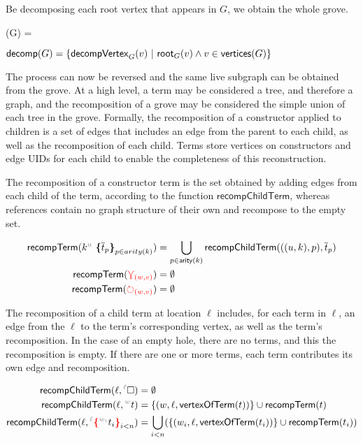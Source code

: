 Be decomposing each root vertex that appears in $G$, we obtain the whole grove. 

\begin{definition}
    (G) = 
\end{definition}

\begin{definition}
    $\mathsf{decomp}(G) = \left\{\mathsf{decompVertex}_{G}(v) ~\vert~\mathsf{root}_G(v) \land v \in \mathsf{vertices}(G)\right\}$
\end{definition}

The process can now be reversed and the same live subgraph can be obtained from the grove. At a high level, a term may be considered a tree, and therefore a graph, and the recomposition of a grove may be considered the simple union of each tree in the grove. Formally, the recomposition of a constructor applied to children is a set of edges that includes an edge from the parent to each child, as well as the recomposition of each child. Terms store vertices on constructors and edge UIDs for each child to enable the completeness of this reconstruction. 

The recomposition of a constructor term is the set obtained by adding edges from each child of the term, according to the function $\mathsf{recompChildTerm}$, whereas references contain no graph structure of their own and recompose to the empty set. 

\begin{definition}
    \begin{align*}
        \mathsf{recompTerm}(\genericTerm{u}{\subtermMV_p}) &= \bigcup_{p\in \mathsf{arity}(k)}\mathsf{recompChildTerm}(((u,k),p), \subtermMV_p)\\
        \mathsf{recompTerm}(\multiref) &= \emptyset\\
        \mathsf{recompTerm}(\uniref) &= \emptyset
    \end{align*}
\end{definition}

The recomposition of a child term at location $\ell$ includes, for each term in $\ell$, an edge from the $\ell$ to the term's corresponding vertex, as well as the term's recomposition. In the case of an empty hole, there are no terms, and this the recomposition is empty. If there are one or more terms, each term contributes its own edge and recomposition. 

\begin{definition}
    \begin{align*}
    \mathsf{recompChildTerm}(\ell, \ehole) &= \emptyset\\
    \mathsf{recompChildTerm}(\ell, \eid{w}{}\termMV) &= \SetOf{(w, \ell, \mathsf{vertexOfTerm}(\termMV))}\cup \mathsf{recompTerm}(t)\\
    \mathsf{recompChildTerm}(\ell, \conflictHoleTerm{\ell}{\eid{w_i}{}\termMV_i}_{i<n}) &= \bigcup_{i<n} (\SetOf{(w_i, \ell, \mathsf{vertexOfTerm}(\termMV_i))}\cup \mathsf{recompTerm}(t_i))
    \end{align*}
\end{definition}    

